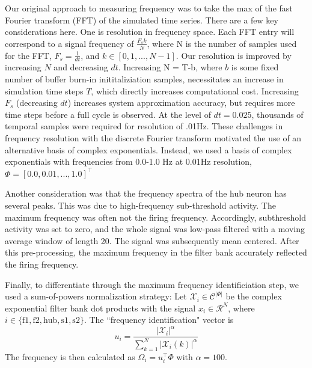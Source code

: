 \documentclass[11pt]{article}
\begin{document}
Our original approach to measuring frequency was to take the max of the fast Fourier transform (FFT) of the simulated time series.  There are a few key considerations here.  One is resolution in frequency space.  Each FFT entry will correspond to a signal frequency of $\frac{F_s k}{N}$, where N is the number of samples used for the FFT, $F_s = \frac{1}{dt}$, and $k \in \left[0, 1, ..., N-1\right]$.  Our resolution is improved by increasing $N$ and decreasing $dt$.  Increasing N = T-b, where $b$ is some fixed number of buffer burn-in inititaliziation samples, necessitates an increase in simulation time steps $T$, which directly increases computational cost.  Increasing $F_s$ (decreasing $dt$) increases system approximation accuracy, but requires more time steps before a full cycle is observed.  At the level of $dt = 0.025$, thousands of temporal samples were required for resolution of .01Hz.  These challenges in frequency resolution with the discrete Fourier transform motivated the use of an alternative basis of complex exponentials.  Instead, we used a basis of complex exponentials with frequencies from 0.0-1.0 Hz at 0.01Hz resolution, $\Phi = \left[ 0.0, 0.01, ..., 1.0 \right]^\top$

Another consideration was that the frequency spectra of the hub neuron has several peaks.  This was due to high-frequency sub-threshold activity. The maximum frequency was often not the firing frequency.  Accordingly, subthreshold activity was set to zero, and the whole signal was low-pass filtered with a moving average window of length 20.  The signal was subsequently mean centered.  After this pre-processing, the maximum frequency in the filter bank accurately reflected the firing frequency.

Finally, to differentiate through the maximum frequency identificiation step, we used a sum-of-powers normalization strategy: Let $\mathcal{X}_i \in \mathcal{C}^{|\Phi|}$ be the complex exponential filter bank dot products with the signal $x_i \in \mathcal{R}^{N}$, where $i \in \{ \text{f1}, \text{f2}, \text{hub}, \text{s1}, \text{s2} \}$.  The ``frequency identification" vector is 
\begin{equation}
u_i = \frac{|\mathcal{X}_i|^\alpha}{\sum_{k=1}^N |\mathcal{X}_i(k)|^\alpha}
\end{equation}
The frequency is then calculated as $\Omega_i = u_i^\top \Phi$ with $\alpha = 100$.
\end{document}
